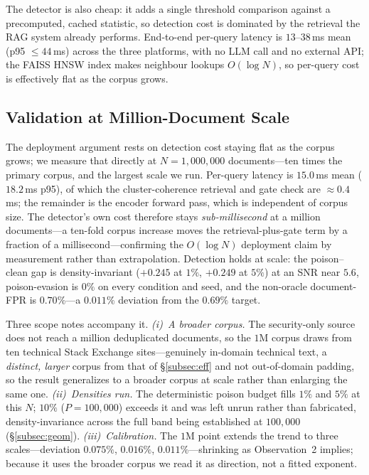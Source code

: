 \documentclass[10pt,journal,compsoc]{IEEEtran}
\begin{document}
The detector is also cheap: it adds a single threshold comparison against a precomputed, cached
statistic, so detection cost is dominated by the retrieval the RAG system already performs.
End-to-end per-query latency is $13$--$38$\,ms mean (p95 $\le 44$\,ms) across the three platforms, with no LLM call and no external API; the FAISS HNSW index makes
neighbour lookups $O(\log N)$, so per-query cost is effectively flat as the corpus grows.

\subsection{Validation at Million-Document Scale}
\label{subsec:scale}
The deployment argument rests on detection cost staying flat as the corpus grows; we
measure that directly at $N=1{,}000{,}000$ documents---ten times the primary corpus,
and the largest scale we run. Per-query latency is $15.0$\,ms mean ($18.2$\,ms p95),
of which the cluster-coherence retrieval and gate check are $\approx\!0.4$\,ms; the
remainder is the encoder forward pass, which is independent of corpus size. The
detector's own cost therefore stays \emph{sub-millisecond} at a million
documents---a ten-fold corpus increase moves the retrieval-plus-gate term by a
fraction of a millisecond---confirming the $O(\log N)$ deployment claim by measurement
rather than extrapolation. Detection holds at scale: the
poison--clean gap is density-invariant ($+0.245$ at $1\%$, $+0.249$ at $5\%$) at an
SNR near $5.6$, poison-evasion is $0\%$ on every condition and seed, and the
non-oracle document-FPR is $0.70\%$---a $0.011\%$ deviation from the $0.69\%$
target.

Three scope notes accompany it. \emph{(i)~A broader corpus.} The security-only source does not
reach a million deduplicated documents, so the $1$M corpus draws from ten technical Stack
Exchange sites---genuinely in-domain technical text, a \emph{distinct, larger} corpus from that
of \S\ref{subsec:eff} and not out-of-domain padding, so the result generalizes to a broader
corpus at scale rather than enlarging the same one. \emph{(ii)~Densities run.} The deterministic
poison budget fills $1\%$ and $5\%$ at this $N$; $10\%$ ($P=100{,}000$) exceeds it and was left
unrun rather than fabricated, density-invariance across the full band being established at
$100{,}000$ (\S\ref{subsec:geom}). \emph{(iii)~Calibration.} The $1$M point extends the trend to
three scales---deviation $0.075\%$, $0.016\%$, $0.011\%$---shrinking as Observation~2 implies;
because it uses the broader corpus we read it as direction, not a fitted exponent.
\end{document}
